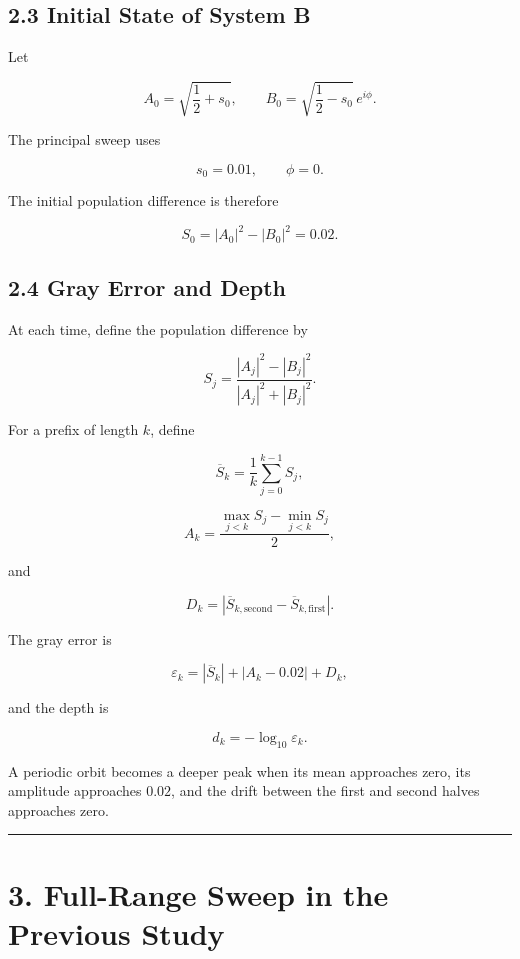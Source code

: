 \documentclass[
  10pt,
  a4paper,
]{article}
\begin{document}
\subsection{2.3 Initial State of System
B}\label{initial-state-of-system-b}

Let

\[
A_0=\sqrt{\frac12+s_0},
\qquad
B_0=\sqrt{\frac12-s_0}\,e^{i\phi}.
\]

The principal sweep uses

\[
s_0=0.01,\qquad \phi=0.
\]

The initial population difference is therefore

\[
S_0=|A_0|^2-|B_0|^2=0.02.
\]

\subsection{2.4 Gray Error and Depth}\label{gray-error-and-depth}

At each time, define the population difference by

\[
S_j=
\frac{|A_j|^2-|B_j|^2}
{|A_j|^2+|B_j|^2}.
\]

For a prefix of length \(k\), define

\[
\overline S_k
=\frac1k\sum_{j=0}^{k-1}S_j,
\]

\[
A_k
=\frac{\max_{j<k}S_j-\min_{j<k}S_j}{2},
\]

and

\[
D_k
=\left|
\overline S_{k,\mathrm{second}}
-\overline S_{k,\mathrm{first}}
\right|.
\]

The gray error is

\[
\varepsilon_k
=|\overline S_k|
+|A_k-0.02|
+D_k,
\]

and the depth is

\[
\boxed{
d_k=-\log_{10}\varepsilon_k
}.
\]

A periodic orbit becomes a deeper peak when its mean approaches zero,
its amplitude approaches \(0.02\), and the drift between the first and
second halves approaches zero.

\begin{center}\rule{0.5\linewidth}{0.5pt}\end{center}

\section{3. Full-Range Sweep in the Previous
Study}\label{full-range-sweep-in-the-previous-study}
\end{document}
